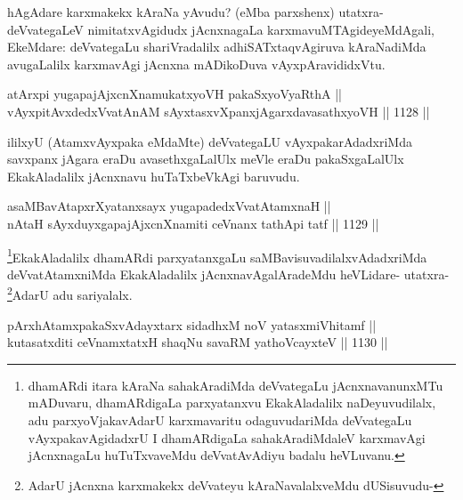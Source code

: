 \begin{artha}
hAgAdare karxmakekx kAraNa yAvudu? (eMba parxshenx) utatxra-deVvategaLeV nimitatxvAgidudx jAcnxnagaLa karxmavuMTAgideyeMdAgali, EkeMdare: deVvategaLu shariVradalilx adhiSATxtaqvAgiruva kAraNadiMda avugaLalilx karxmavAgi jAcnxna mADikoDuva vAyxpAravididxVtu.
\end{artha}


\begin{shl}
atArxpi yugapajAjxcnXnamukatxyoVH pakaSxyoVyaRthA || \\
vAyxpitAvxdedxVvatAnAM sAyxtasxvXpanxjAgarxdavasathxyoVH ||  1128 ||  
\end{shl}

\begin{artha}
ililxyU (AtamxvAyxpaka eMdaMte) deVvategaLU vAyxpakarAdadxriMda savxpanx jAgara eraDu avasethxgaLalUlx meVle eraDu pakaSxgaLalUlx EkakAladalilx jAcnxnavu huTaTxbeVkAgi baruvudu.
\end{artha}


\begin{shl}
asaMBavAtapxrXyatanxsayx yugapadedxVvatAtamxnaH || \\
nAtaH sAyxduyxgapajAjxcnXnamiti ceVnanx tathA\s pi tatf ||  1129 ||  
\end{shl}

\begin{artha}
\footnote{dhamARdi itara kAraNa sahakAradiMda deVvategaLu jAcnxnavanunxMTu mADuvaru, dhamARdigaLa parxyatanxvu EkakAladalilx naDeyuvudilalx, adu parxyoVjakavAdarU karxmavaritu odaguvudariMda deVvategaLu vAyxpakavAgidadxrU I dhamARdigaLa sahakAradiMdaleV karxmavAgi jAcnxnagaLu huTuTxvaveMdu deVvatAvAdiyu badalu heVLuvanu.}EkakAladalilx dhamARdi parxyatanxgaLu saMBavisuvadilalxvAdadxriMda deVvatAtamxniMda EkakAladalilx jAcnxnavAgalAradeMdu heVLidare- utatxra- \footnote{AdarU jAcnxna karxmakekx deVvateyu kAraNavalalxveMdu dUSisuvudu-}AdarU adu sariyalalx.
\end{artha}

\begin{shl}
pArxhA\s \s tamxpakaSxvAdayxtarx sidadhxM noV yatasxmiVhitamf ||  \\
kutasatxditi ceVnamxtatxH shaqNu savaRM yathoVcayxteV ||  1130 ||  
\end{shl}

